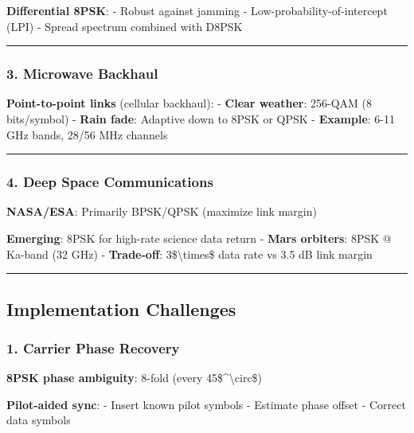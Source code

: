 \textbf{Differential 8PSK}: - Robust against jamming -
Low-probability-of-intercept (LPI) - Spread spectrum combined with D8PSK

\begin{center}\rule{0.5\linewidth}{0.5pt}\end{center}

\subsubsection{3. Microwave Backhaul}\label{microwave-backhaul}

\textbf{Point-to-point links} (cellular backhaul): - \textbf{Clear
weather}: 256-QAM (8 bits/symbol) - \textbf{Rain fade}: Adaptive down to
8PSK or QPSK - \textbf{Example}: 6-11 GHz bands, 28/56 MHz channels

\begin{center}\rule{0.5\linewidth}{0.5pt}\end{center}

\subsubsection{4. Deep Space
Communications}\label{deep-space-communications}

\textbf{NASA/ESA}: Primarily BPSK/QPSK (maximize link margin)

\textbf{Emerging}: 8PSK for high-rate science data return - \textbf{Mars
orbiters}: 8PSK @ Ka-band (32 GHz) - \textbf{Trade-off}:
3\$\textbackslash times\$ data rate vs 3.5 dB link margin

\begin{center}\rule{0.5\linewidth}{0.5pt}\end{center}

\subsection{Implementation Challenges}\label{implementation-challenges}

\subsubsection{1. Carrier Phase Recovery}\label{carrier-phase-recovery}

\textbf{8PSK phase ambiguity}: 8-fold (every
45\$\^{}\textbackslash circ\$)

\textbf{Pilot-aided sync}: - Insert known pilot symbols - Estimate phase
offset - Correct data symbols

